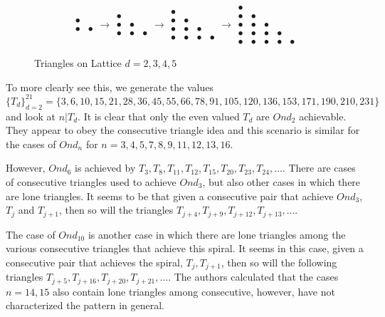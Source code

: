 \documentclass[11pt,reqno]{amsart}
\theoremstyle{mydef}
\begin{document}
\begin{figure}[h]
\[  \begin{array}{cc}
\bullet & \ \\
\bullet & \bullet
\end{array} 
\rightarrow
%
\begin{array}{ccc}
\bullet & \  & \ \\
\bullet & \bullet \\
\bullet & \bullet & \bullet 
\end{array}
\rightarrow
\begin{array}{cccc}
\bullet & \  & \  & \  \\
\bullet & \bullet & \  & \  \\
\bullet & \bullet & \bullet & \  \\
\bullet & \bullet & \bullet & \bullet
\end{array}
\rightarrow
\begin{array}{ccccc}
\bullet & \  & \  & \  & \  \\
\bullet & \bullet & \   & \  & \  \\
\bullet & \bullet & \bullet  & \ & \  \\
\bullet & \bullet & \bullet & \bullet & \  \\
\bullet & \bullet & \bullet & \bullet & \bullet
\end{array}
\]
\caption{Triangles on Lattice $d = 2, 3, 4, 5$}
\label{fig:trianglegrowth}
\end{figure}

To more clearly see this, we generate the values 
\[
	\{ T_d \}_{d=2}^{21} = \{ 3, 6, 10, 15, 21, 28,   36, 45, 55, 66, 78,   91, 105, 120, 136, 153, 171,190,210,231 \}
\]
and look at $n \vert T_d$. It is clear that only the even valued $T_d$ are $Ond_2$ achievable. They appear to 
obey the consecutive triangle idea and this scenario is similar for the cases of $Ond_n$ for $n = 3, 4, 5, 7, 8, 9, 11, 12, 13, 16$.

However, $Ond_6$ is achieved by $T_3, T_8, T_{11}, T_{12}, T_{15}, T_{20}, T_{23}, T_{24}, \ldots$. There are 
cases of consecutive triangles used to achieve $Ond_3$, but also other cases in which there are lone triangles.
It seems to be that given a consecutive pair that achieve $Ond_3$, $T_j$ and $T_{j+1}$, then so will the triangles 
 $T_{j+4}, T_{j+9}, T_{j+12}, T_{j+13}, \ldots$.

The case of $Ond_{10}$ is another case in which there are lone triangles among the various consecutive triangles
that achieve this spiral. It seems in this case, given a consecutive pair that achieves the spiral, $T_{j}, T_{j+1}$, then
so will the following triangles $T_{j+5}, T_{j+16}, T_{j+20}, T_{j+21}, \ldots$. The authors  calculated that the cases
$n = 14, 15$ also contain lone triangles among consecutive, however, have not characterized the pattern in general.
\end{document}
